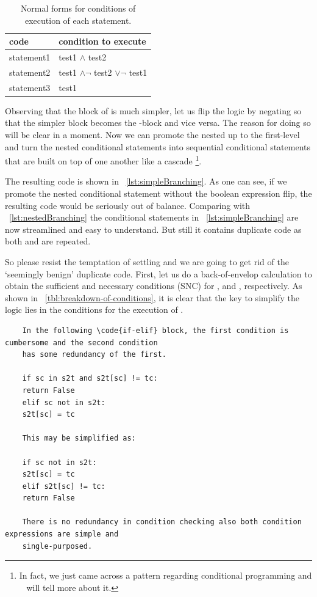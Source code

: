 \begin{table}[bth]
    \begin{center}
        \caption{Normal forms for conditions of execution of each statement.
        \label{tbl:breakdown-of-conditions}}
        \begin{tabular}{|l|l|}
            \hline
            code & condition to execute \\
            \hline
            statement1 & test1 $\land$ test2 \\
            statement2 & test1 $\land\lnot$ test2 $\lor\lnot$ test1 \\
            statement3 & test1 \\
            \hline
        \end{tabular}
    \end{center}
\end{table}
Observing that the  block of  is much simpler, let us flip
the logic by negating  so that the simpler block becomes the -block and vice
versa.
The reason for doing so will be clear in a moment.
Now we can promote the nested  up to the first-level and turn the
nested conditional statements into sequential conditional statements
that are built on top of one another like a cascade \footnote{In fact,
we just came across a pattern regarding conditional programming and
~ will tell more about it.}.


The resulting code is shown in ~\autoref{lst:simpleBranching}.
As one can see, if we promote the nested conditional statement without the boolean expression
flip, the resulting code would be seriously out of balance.
Comparing with ~\autoref{lst:nestedBranching} the conditional statements in
~\autoref{lst:simpleBranching} are now streamlined and easy to understand.
But still it contains duplicate code as both  and  are repeated.


So please resist the temptation of settling and we are going to get rid of the `seemingly benign'
duplicate code.
First, let us do a back-of-envelop calculation to
obtain the sufficient and necessary conditions (SNC) for , 
and , respectively.
As shown in ~\autoref{tbl:breakdown-of-conditions},
it is clear that the key to simplify the logic lies in the conditions for the
execution of .

\begin{verbatim}
    In the following \code{if-elif} block, the first condition is cumbersome and the second condition
    has some redundancy of the first.

    if sc in s2t and s2t[sc] != tc:
    return False
    elif sc not in s2t:
    s2t[sc] = tc

    This may be simplified as:

    if sc not in s2t:
    s2t[sc] = tc
    elif s2t[sc] != tc:
    return False

    There is no redundancy in condition checking also both condition expressions are simple and
    single-purposed.
\end{verbatim}

